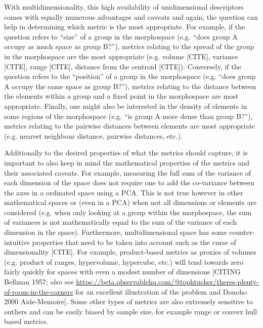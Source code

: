 \documentclass[12pt,letterpaper]{article}
\begin{document}
With multidimensionality, this high availability of unidimensional descriptors comes with equally numerous advantages and caveats and again, the question can help in determining which metric is the most appropriate.
For example, if the question refers to ``size'' of a group in the morphospace (e.g. ``does group A occupy as much space as group B?''), metrics relating to the spread of the group in the morphospace are the most appropriate (e.g. volume [CITE], variance [CITE], range [CITE], distance from the centroid [CITE]).
Conversely, if the question refers to the ``position'' of a group in the morphospace (e.g. ``does group A occupy the same space as group B?''), metrics relating to the distance between the elements within a group and a fixed point in the morphospace are most appropriate.
Finally, one might also be interested in the density of elements in some regions of the morphospace (e.g. ``is group A more dense than group B?''), metrics relating to the pairwise distances between elements are most appropriate (e.g. nearest neighbour distance, pairwise distances, etc.).

Additionally to the desired properties of what the metrics should capture, it is important to also keep in mind the mathematical properties of the metrics and their associated caveats.
For example, measuring the full sum of the variance of each dimension of the space does not require one to add the co-variance between the axes in a ordinated space using a PCA.
This is not true however in other mathematical spaces or (even in a PCA) when not all dimensions or elements are considered (e.g. when only looking at a group within the morphospace, the sum of variances is not mathematically equal to the sum of the variance of each dimension in the space).
Furthermore, multidimensional space has some counter-intuitive properties that need to be taken into account such as the curse of dimensionality [CITE].
For example, product-based metrics as proxies of volumes (e.g. product of ranges, hypervolume, hypercube, etc.) will tend towards zero fairly quickly for spaces with even a modest number of dimensions [CITING Bellman 1957; also see \url{https://beta.observablehq.com/@tophtucker/theres-plenty-of-room-in-the-corners} for an excellent illustration of the problem and Donoho 2000 Aide-Memoire].
Some other types of metrics are also extremely sensitive to outliers and can be easily biased by sample size, for example range or convex hull based metrics.


\end{document}

